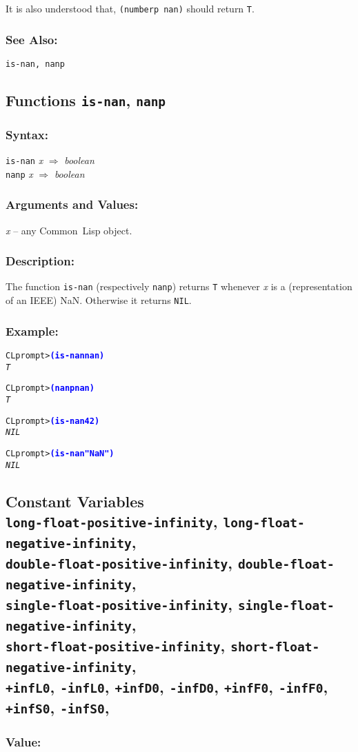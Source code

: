 \documentclass[10pt,fleqn]{article}
\newcommand{\CL}{\textsf{Common~Lisp}}
\newcommand{\code}[1]{\texttt{#1}}
\newcommand{\varname}[1]{\textit{#1}}
\newcommand{\codeprompt}[1]{\textcolor{blue}{\textbf{#1}}}
\newcommand{\DDictionaryItem}[1]{\vspace*{6pt}\noindent\hrulefill\vspace*{-9pt}\subsection*{#1}}
\newcommand{\DSyntax}{\subsubsection*{Syntax:}}
\newcommand{\DArgsNValues}{\subsubsection*{Arguments and Values:}}
\newcommand{\DDescription}{\subsubsection*{Description:}}
\newcommand{\DSeeAlso}{\subsubsection*{See Also:}}
\begin{document}
\noindent
It is also understood that, \code{(numberp nan)} should return \code{T}.

\DSeeAlso{}

\code{is-nan, nanp}


\DDictionaryItem{Functions \code{is-nan}, \code{nanp}}

\DSyntax{}

\code{is-nan} \varname{x} $\Rightarrow$ \textit{boolean}\\
\code{nanp} \varname{x} $\Rightarrow$ \textit{boolean}

\DArgsNValues{}

\varname{x} -- any \CL{} object.

\DDescription{}

The function \code{is-nan} (respectively \code{nanp}) returns \code{T}
whenever \varname{x} is a (representation of an IEEE) NaN.  Otherwise
it returns \code{NIL}.


\subsubsection*{Example:}

\begin{alltt}
CL prompt> \codeprompt{(is-nan nan)}
\textit{T}

CL prompt> \codeprompt{(nanp nan)}
\textit{T}

CL prompt> \codeprompt{(is-nan 42)}
\textit{NIL}

CL prompt> \codeprompt{(is-nan "NaN")}
\textit{NIL}
\end{alltt}



\DDictionaryItem{Constant Variables\\
  \code{long-float-positive-infinity},
  \code{long-float-negative-infinity},\\
  \code{double-float-positive-infinity},
  \code{double-float-negative-infinity},\\
  \code{single-float-positive-infinity},
  \code{single-float-negative-infinity},\\
  \code{short-float-positive-infinity},
  \code{short-float-negative-infinity},\\
  \code{+infL0}, 
  \code{-infL0},
  \code{+infD0}, 
  \code{-infD0},
  \code{+infF0}, 
  \code{-infF0},
  \code{+infS0}, 
  \code{-infS0},
  }

\subsubsection*{Value:}
\end{document}
